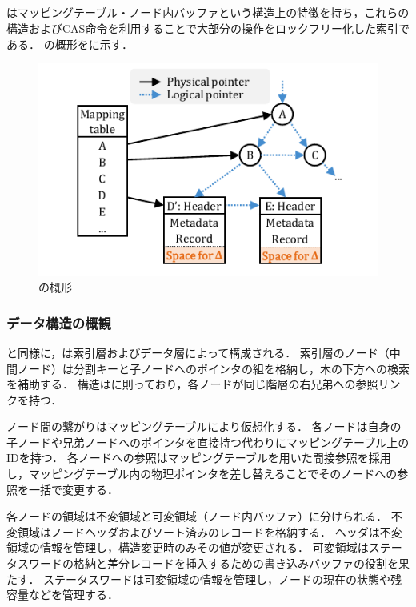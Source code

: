 \subsection{\Bctree{}}
\Bctree{}はマッピングテーブル・ノード内バッファという構造上の特徴を持ち，これらの構造およびCAS命令を利用することで大部分の操作をロックフリー化した索引である．
\Bctree{}の概形を\Fig{\ref{fig:bc_tree-structure}}に示す．

\begin{figure}[t]
    \centering
    \includegraphics{./figures/Bc-structure.pdf}
    \caption{\Bctree{}の概形}
    \label{fig:bc_tree-structure}
\end{figure}

\subsubsection{データ構造の概観}
\Bptree{}と同様に，\Bctree{}は索引層およびデータ層によって構成される．
索引層のノード（中間ノード）は分割キーと子ノードへのポインタの組を格納し，木の下方への検索を補助する．
構造は\Blinktree{}に則っており，各ノードが同じ階層の右兄弟への参照リンクを持つ．

ノード間の繋がりはマッピングテーブルにより仮想化する．
各ノードは自身の子ノードや兄弟ノードへのポインタを直接持つ代わりにマッピングテーブル上のIDを持つ．
各ノードへの参照はマッピングテーブルを用いた間接参照を採用し，マッピングテーブル内の物理ポインタを差し替えることでそのノードへの参照を一括で変更する．

各ノードの領域は不変領域と可変領域（ノード内バッファ）に分けられる．
不変領域はノードヘッダおよびソート済みのレコードを格納する．
ヘッダは不変領域の情報を管理し，構造変更時のみその値が変更される．
可変領域はステータスワードの格納と差分レコードを挿入するための書き込みバッファの役割を果たす．
ステータスワードは可変領域の情報を管理し，ノードの現在の状態や残容量などを管理する．

